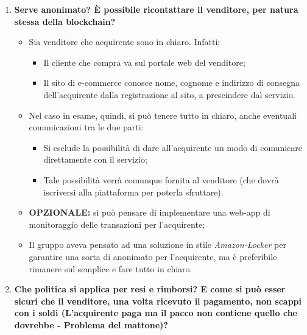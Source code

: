 \documentclass[11pt]{article}
\begin{document}
\begin{enumerate}
				\bigskip				
				
				\item \textbf{Serve anonimato? È possibile ricontattare il venditore, per natura stessa della blockchain?}
				
				\medskip
				
				\begin{itemize}
					\item Sia venditore che acquirente sono in chiaro. Infatti:
					\begin{itemize}
						\item Il cliente che compra va sul portale web del venditore;
						\item Il sito di e-commerce conosce nome, cognome e indirizzo di consegna dell'acquirente dalla
						registrazione al sito, a prescindere dal servizio.
					\end{itemize}
					\item Nel caso in esame, quindi, si può tenere tutto in chiaro, anche eventuali comunicazioni tra le due
					parti:
					\begin{itemize}
						\item Si esclude la possibilità di dare all'acquirente un modo di comunicare direttamente con il servizio;
						\item Tale possibilità verrà comunque fornita al venditore (che dovrà iscriversi alla piattaforma per
						poterla sfruttare).
					\end{itemize}
					\item \textbf{OPZIONALE:} si può pensare di implementare una web-app di monitoraggio delle transazioni
					per l'acquirente;
					\item Il gruppo aveva pensato ad una soluzione in stile \textit{Amazon-Locker} per garantire una sorta di anonimato per
					l'acquirente, ma è preferibile rimanere sul semplice e fare tutto in chiaro.
				\end{itemize}
				
				\bigskip
				
				\item \textbf{Che politica si applica per resi e rimborsi? E come si può esser sicuri che il venditore, una volta
				ricevuto il pagamento, non scappi con i soldi (L'acquirente paga ma il pacco non contiene quello che dovrebbe -
				Problema del mattone)?}
				
				\medskip
				

\end{enumerate}
\end{document}
